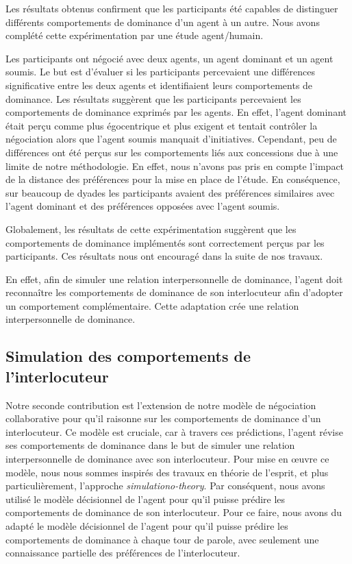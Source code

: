 	Les résultats obtenus confirment que les participants été capables de distinguer différents comportements de dominance d'un agent à un autre. Nous avons complété cette expérimentation par une étude agent/humain. 
	
	Les participants ont négocié avec deux agents, un agent dominant et un agent soumis. Le but est d'évaluer si les participants percevaient une différences significative entre les deux agents et identifiaient leurs comportements de dominance.
	Les résultats suggèrent que les participants percevaient les comportements de dominance exprimés par les agents. En effet, l'agent dominant était perçu comme plus égocentrique et plus exigent et tentait contrôler la négociation alors que l'agent soumis manquait d'initiatives. Cependant, peu de différences ont été perçus sur les comportements liés aux concessions due à une limite de notre méthodologie. En effet, nous n'avons pas pris en compte l'impact de la distance des préférences pour la mise en place de l'étude. En conséquence, sur beaucoup de dyades les participants avaient des préférences similaires avec l'agent dominant et des préférences opposées avec l'agent soumis. 
	
	Globalement, les résultats de cette expérimentation suggèrent que les comportements de dominance implémentés sont correctement perçus par les participants. Ces résultats nous ont encouragé dans la suite de nos travaux. 
	
	En effet, afin de simuler une relation interpersonnelle de dominance, l'agent doit reconnaître les comportements de dominance de son interlocuteur afin d'adopter un comportement complémentaire. Cette adaptation crée une relation interpersonnelle de dominance.  
	
	\subsection{Simulation des comportements de l'interlocuteur}
	
		Notre seconde contribution est l'extension de notre modèle de négociation collaborative pour qu'il raisonne sur les comportements de dominance d'un interlocuteur. Ce modèle est cruciale, car à travers ces prédictions, l'agent révise ses comportements de dominance dans le but de simuler une relation interpersonnelle de dominance avec son interlocuteur. 
		Pour mise en œuvre ce modèle, nous nous sommes inspirés des travaux en théorie de l'esprit, et plus particulièrement, l'approche \emph{simulationo-theory}. Par conséquent, nous avons utilisé le modèle décisionnel de l'agent pour qu'il puisse prédire les comportements de dominance de son interlocuteur. 
		Pour ce faire, nous avons du adapté le modèle décisionnel de l'agent pour qu'il puisse prédire les comportements de dominance à chaque tour de parole, avec seulement une connaissance partielle des préférences de l'interlocuteur. 
		
